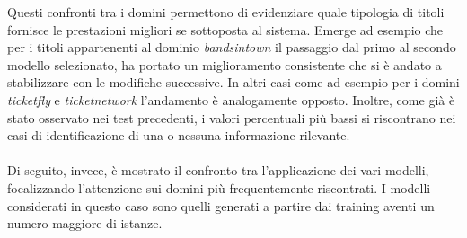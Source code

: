 \documentclass[a4paper]{report}
\begin{document}
Questi confronti tra i domini permettono di evidenziare quale tipologia di titoli fornisce le prestazioni migliori se sottoposta al sistema. Emerge ad esempio che per i titoli appartenenti al dominio \textit{bandsintown} il passaggio dal primo al secondo modello selezionato, ha portato un miglioramento consistente che si è andato a stabilizzare con le modifiche successive. In altri casi come ad esempio per i domini \textit{ticketfly} e \textit{ticketnetwork} l'andamento è analogamente opposto. Inoltre, come già è stato osservato nei test precedenti, i valori percentuali più bassi si riscontrano nei casi di identificazione di una o nessuna informazione rilevante.
\\ \\
Di seguito, invece, è mostrato il confronto tra l'applicazione dei vari modelli, focalizzando l'attenzione sui domini più frequentemente riscontrati. I modelli considerati in questo caso sono quelli generati a partire dai training aventi un numero maggiore di istanze.
\end{document}
